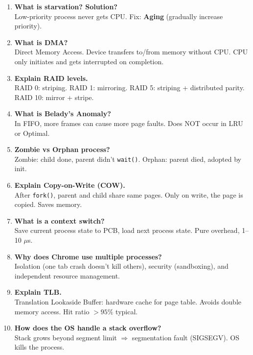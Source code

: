 \documentclass[12pt,a4paper]{article}
\begin{document}
\begin{enumerate}[leftmargin=*, label=\textbf{Q\arabic*.}]
\item \textbf{What is starvation? Solution?} \\
Low-priority process never gets CPU. Fix: \textbf{Aging} (gradually increase priority).

\item \textbf{What is DMA?} \\
Direct Memory Access. Device transfers to/from memory without CPU. CPU only initiates and gets interrupted on completion.

\item \textbf{Explain RAID levels.} \\
RAID 0: striping. RAID 1: mirroring. RAID 5: striping + distributed parity. RAID 10: mirror + stripe.

\item \textbf{What is Belady's Anomaly?} \\
In FIFO, more frames can cause more page faults. Does NOT occur in LRU or Optimal.

\item \textbf{Zombie vs Orphan process?} \\
Zombie: child done, parent didn't \texttt{wait()}. Orphan: parent died, adopted by init.

\item \textbf{Explain Copy-on-Write (COW).} \\
After \texttt{fork()}, parent and child share same pages. Only on write, the page is copied. Saves memory.

\item \textbf{What is a context switch?} \\
Save current process state to PCB, load next process state. Pure overhead, 1--10 $\mu$s.

\item \textbf{Why does Chrome use multiple processes?} \\
Isolation (one tab crash doesn't kill others), security (sandboxing), and independent resource management.

\item \textbf{Explain TLB.} \\
Translation Lookaside Buffer: hardware cache for page table. Avoids double memory access. Hit ratio $>95\%$ typical.

\item \textbf{How does the OS handle a stack overflow?} \\
Stack grows beyond segment limit $\Rightarrow$ segmentation fault (SIGSEGV). OS kills the process.

\end{enumerate}
\end{document}
